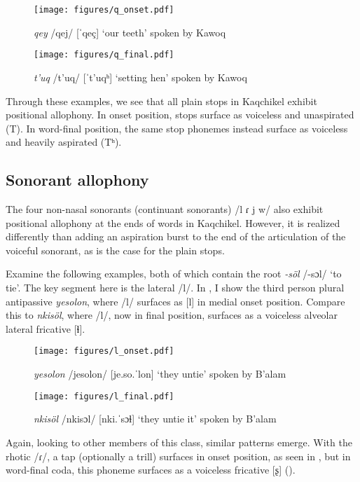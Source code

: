 \documentclass[output=paper,colorlinks,citecolor=brown]{langscibook}
\begin{document}
\begin{figure}
\texttt{[image: figures/q\_onset.pdf]}
\caption{ \emph{qey} /qej/ [ˈqeç] ‘our teeth’ spoken by Kawoq}
\label{q_onset}
\end{figure}

\begin{figure}
\texttt{[image: figures/q\_final.pdf]}
\caption{ \emph{t’uq} /t’uq/ [ˈt’uqʰ] ‘setting hen’ spoken by Kawoq}
\label{q_final}
\end{figure}

Through these examples, we see that all plain stops in Kaqchikel exhibit positional allophony. In onset position, stops surface as voiceless and unaspirated (T). In word-final position, the same stop phonemes instead surface as voiceless and heavily aspirated (Tʰ).

\subsection{Sonorant allophony}\label{Sonorant allophony}
The four non-nasal sonorants (continuant sonorants) /l ɾ j w/  also exhibit positional allophony at the ends of words in Kaqchikel. However, it is realized differently than adding an aspiration burst to the end of the articulation of the voiceful sonorant, as is the case for the plain stops.

Examine the following examples, both of which contain the root \emph{-söl} /-sɔl/ ‘to tie’. The key segment here is the lateral /l/. In , I show the third person plural antipassive \emph{yesolon}, where /l/ surfaces as [l] in medial onset position. Compare this to  \emph{nkisöl}, where /l/, now in final position, surfaces as a voiceless alveolar lateral fricative [ɬ]. 

\begin{figure}
\texttt{[image: figures/l\_onset.pdf]}
\caption{ \emph{yesolon} /jesolon/ [je.so.ˈlon] ‘they untie’ spoken by B’alam}
\label{l_onset}
\end{figure}

\begin{figure}
\texttt{[image: figures/l\_final.pdf]}
\caption{ \emph{nkisöl} /nkisɔl/ [nki.ˈsɔɬ] ‘they untie it’ spoken by B’alam}
\label{l_final}
\end{figure}

Again, looking to other members of this class, similar patterns emerge. With the rhotic /ɾ/, a tap (optionally a trill) surfaces in onset position, as seen in , but in word-final coda, this phoneme surfaces as a voiceless fricative [ʂ] ().
\end{document}
